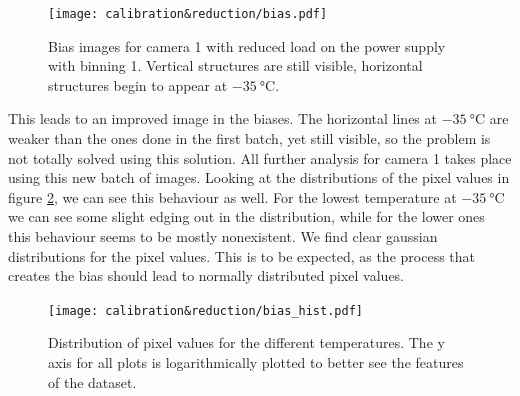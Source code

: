 \documentclass{article}
\begin{document}
\begin{figure}[H]
    \centering
    \texttt{[image: calibration\&reduction/bias.pdf]}
    \caption{Bias images for camera 1 with reduced load on the power supply with binning 1. Vertical structures are still visible, horizontal structures begin to appear at $\SI{-35}{\celsius}$.}
    \label{fig:Bias_new_b_1_calib}
\end{figure}
This leads to an improved image in the biases. The horizontal lines at $\SI{-35}{\celsius}$ are weaker than the ones done in the first batch, yet still visible, so the problem is not totally solved using this solution. All further analysis for camera 1 takes place using this new batch of images. Looking at the distributions of the pixel values in figure \ref{fig:Bias_calib_hist}, we can see this behaviour as well. For the lowest temperature at $\SI{-35}{\celsius}$ we can see some slight edging out in the distribution, while for the lower ones this behaviour seems to be mostly nonexistent. We find clear gaussian distributions for the pixel values. This is to be expected, as the process that creates the bias should lead to normally distributed pixel values.
\begin{figure}[H]
    \centering
    \texttt{[image: calibration\&reduction/bias\_hist.pdf]}
    \caption{Distribution of pixel values for the different temperatures. The y axis for all plots is logarithmically plotted to better see the features of the dataset.}
    \label{fig:Bias_calib_hist}
\end{figure}
\end{document}
